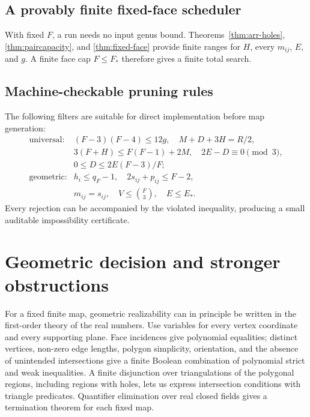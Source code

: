 \documentclass[11pt,a4paper]{article}
\theoremstyle{definition}
\newcommand{\binomFthree}{\binom{F}{3}}
\begin{document}
\subsection{A provably finite fixed-face scheduler}

With fixed $F$, a run needs no input genus bound.
Theorems~\ref{thm:arr-holes}, \ref{thm:paircapacity}, and
\ref{thm:fixed-face} provide finite ranges for $H$, every $m_{ij}$, $E$, and
$g$. A finite face cap $F\leq F_*$ therefore gives a finite total search.

\subsection{Machine-checkable pruning rules}

The following filters are suitable for direct implementation before map
generation:
\[
\begin{array}{ll}
\text{universal:}&
(F-3)(F-4)\leq12g,\quad
M+D+3H=R/2,\\[2mm]
&3(F+H)\leq F(F-1)+2M,\quad
2E-D\equiv0\pmod3,\\[2mm]
&0\leq D\leq 2E(F-3)/F;\\[2mm]
\text{geometric:}&
h_i\leq q_F-1,\quad
2s_{ij}+p_{ij}\leq F-2,\\[2mm]
&m_{ij}=s_{ij},\quad
V\leq\binomFthree,\quad E\leq E_*.
\end{array}
\]
Every rejection can be accompanied by the violated inequality, producing a
small auditable impossibility certificate.

\section{Geometric decision and stronger obstructions}

For a fixed finite map, geometric realizability can in principle be written
in the first-order theory of the real numbers.  Use variables for every vertex
coordinate and every supporting plane.  Face incidences give polynomial
equalities; distinct vertices, non-zero edge lengths, polygon simplicity,
orientation, and the absence of unintended intersections give a finite
Boolean combination of polynomial strict and weak inequalities. A finite
disjunction over triangulations of the polygonal regions, including regions
with holes, lets us express intersection conditions with triangle
predicates. Quantifier elimination over real closed fields gives a
termination theorem for each fixed map.
\end{document}
